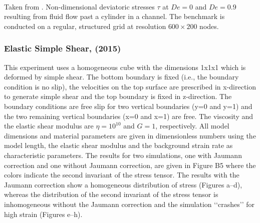 \begin{center}
\\
{\captionfont Taken from \textcite{bepo10}.
Non-dimensional deviatoric stresses $\tau$ at $De = 0$ and $De = 0.9$ 
resulting from fluid flow past a cylinder in a channel. The benchmark is conducted
on a regular, structured grid at resolution $600 \times 200$ nodes.
}
\end{center}




\subsubsection{Elastic Simple Shear,  \textcite{vosc15} (2015)}



This experiment uses a homogeneous cube with the dimensions 1x1x1 which is
deformed by simple shear. The bottom boundary is fixed 
(i.e., the boundary condition is no slip), the
velocities on the top surface are prescribed in x-direction to generate 
simple shear and the top boundary is fixed in z-direction. 
The boundary conditions are free slip for two vertical boundaries (y=0 and
y=1) and the two remaining vertical boundaries (x=0 and x=1) are free. 
The viscosity and the elastic shear modulus are $\eta=10^{10}$ and $G=1$, 
respectively. All model dimensions and material parameters
are given in dimensionless numbers using the model length, the elastic 
shear modulus and the background strain rate as characteristic parameters. 
The results for two simulations, one with Jaumann correction and one without 
Jaumann correction, are given in Figure B5 where the colors indicate the
second invariant of the stress tensor. The results with the Jaumann correction 
show a homogeneous distribution of stress (Figures a–d), whereas the distribution 
of the second invariant of the stress tensor is inhomogeneous without the 
Jaumann correction and the simulation ‘‘crashes’’ for high strain
(Figures e–h).

